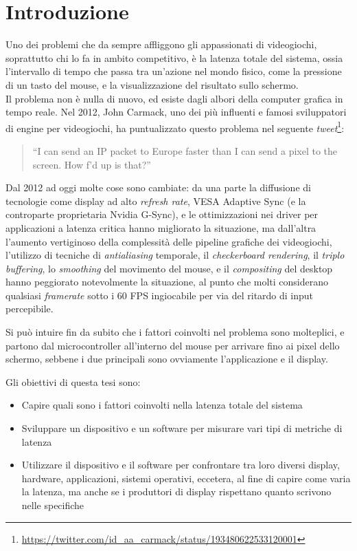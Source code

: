 \setlength{\parskip}{1em}
\setlength{\parindent}{0pt}
\chapter{Introduzione}
\label{chap:intro}

Uno dei problemi che da sempre affliggono gli appassionati di videogiochi, soprattutto chi lo fa in ambito competitivo, è la latenza totale del sistema, ossia l'intervallo di tempo che passa tra un'azione nel mondo fisico, come la pressione di un tasto del mouse, e la visualizzazione del risultato sullo schermo.\\
Il problema non è nulla di nuovo, ed esiste dagli albori della computer grafica in tempo reale. Nel 2012, John Carmack, uno dei più influenti e famosi sviluppatori di engine per videogiochi, ha puntualizzato questo problema nel seguente \textit{tweet}\footnote{\href{https://twitter.com/id_aa_carmack/status/193480622533120001}{https://twitter.com/id\_aa\_carmack/status/193480622533120001}}:
\begin{quotation}
	``I can send an IP packet to Europe faster than I can send a pixel to the screen.  How f’d up is that?''
\end{quotation}
Dal 2012 ad oggi molte cose sono cambiate: da una parte la diffusione di tecnologie come display ad alto \textit{refresh rate}, VESA Adaptive Sync (e la controparte proprietaria Nvidia G-Sync), e le ottimizzazioni nei driver per applicazioni a latenza critica hanno migliorato la situazione, ma dall'altra l'aumento vertiginoso della complessità delle pipeline grafiche dei videogiochi, l'utilizzo di tecniche di \textit{antialiasing} temporale, il \textit{checkerboard rendering}, il \textit{triplo buffering}, lo \textit{smoothing} del movimento del mouse, e il \textit{compositing} del desktop hanno peggiorato notevolmente la situazione, al punto che molti considerano qualsiasi \textit{framerate} sotto i 60 FPS ingiocabile per via del ritardo di input percepibile.

Si può intuire fin da subito che i fattori coinvolti nel problema sono molteplici, e partono dal microcontroller all'interno del mouse per arrivare fino ai pixel dello schermo, sebbene i due principali sono ovviamente l'applicazione e il display.

Gli obiettivi di questa tesi sono:
\begin{itemize}
	\item Capire quali sono i fattori coinvolti nella latenza totale del sistema
	\item Sviluppare un dispositivo e un software per misurare vari tipi di metriche di latenza
	\item Utilizzare il dispositivo e il software per confrontare tra loro diversi display, hardware, applicazioni, sistemi operativi, eccetera, al fine di capire come varia la latenza, ma anche se i produttori di display rispettano quanto scrivono nelle specifiche
\end{itemize} 

